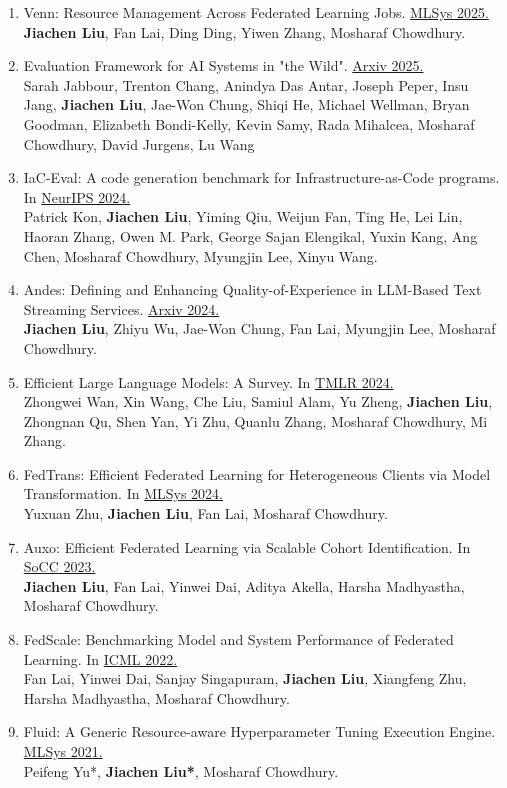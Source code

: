 \documentclass{article}
\begin{document}
\begin{enumerate}[itemsep=-7pt]
\item Venn: Resource Management Across Federated Learning Jobs.
\underline{MLSys 2025.} \\
\textbf{Jiachen Liu}, Fan Lai, Ding Ding, Yiwen Zhang, Mosharaf Chowdhury.

\item Evaluation Framework for AI Systems in "the Wild".
\underline{Arxiv 2025.}\\
Sarah Jabbour, Trenton Chang, Anindya Das Antar, Joseph Peper, Insu Jang, \textbf{Jiachen Liu}, Jae-Won Chung, Shiqi He, Michael Wellman, Bryan Goodman, Elizabeth Bondi-Kelly, Kevin Samy, Rada Mihalcea, Mosharaf Chowdhury, David Jurgens, Lu Wang

\item IaC-Eval: A code generation benchmark for Infrastructure-as-Code programs. In \underline{NeurIPS 2024.} \\
Patrick Kon, \textbf{Jiachen Liu}, Yiming Qiu, Weijun Fan, Ting He, Lei Lin, Haoran Zhang, Owen M. Park, George Sajan Elengikal, Yuxin Kang, Ang Chen, Mosharaf Chowdhury, Myungjin Lee, Xinyu Wang.

\item Andes: Defining and Enhancing Quality-of-Experience in LLM-Based Text Streaming Services. \underline{Arxiv 2024.} \\
\textbf{Jiachen Liu}, Zhiyu Wu, Jae-Won Chung, Fan Lai, Myungjin Lee, Mosharaf Chowdhury.

\item Efficient Large Language Models: A Survey.
In \underline{TMLR 2024.} \\
Zhongwei Wan, Xin Wang, Che Liu, Samiul Alam, Yu Zheng, \textbf{Jiachen Liu}, Zhongnan Qu, Shen Yan, Yi Zhu, Quanlu Zhang, Mosharaf Chowdhury, Mi Zhang.

\item 
FedTrans: Efficient Federated Learning for Heterogeneous Clients via Model Transformation. In \underline{MLSys 2024.} \\
Yuxuan Zhu, \textbf{Jiachen Liu}, Fan Lai, Mosharaf Chowdhury.

\item  
Auxo: Efficient Federated Learning via Scalable Cohort Identification.
In \underline{SoCC 2023.} \\
\textbf{Jiachen Liu}, Fan Lai, Yinwei Dai, Aditya Akella, Harsha Madhyastha, Mosharaf Chowdhury.

\item  
FedScale: Benchmarking Model and System Performance of Federated Learning.
In \underline{ICML 2022.} \\
Fan Lai, Yinwei Dai, Sanjay Singapuram, \textbf{Jiachen Liu}, Xiangfeng Zhu, Harsha Madhyastha, Mosharaf Chowdhury.

\item 
Fluid: A Generic Resource-aware Hyperparameter Tuning Execution Engine.  
\underline{MLSys 2021.}  
\\  Peifeng Yu*, \textbf{Jiachen Liu*}, Mosharaf Chowdhury.
\end{enumerate}
\end{document}
